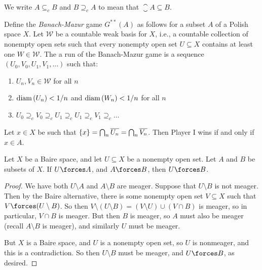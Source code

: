 \documentclass[10pt]{article}
\begin{document}
We write $A \subseteq_c B$ and $B \supseteq_c A$ to mean that $\closure{A} \subseteq B$.

Define the \emph{Banach-Mazur} game $G^{**}(A)$ as follows for a subset $A$ of a Polish space $X$.
Let $\mathcal{W}$ be a countable weak basis for $X$, i.e., a countable collection of nonempty open sets such that every nonempty open set $U \subseteq X$ contains at least one $W \in \mathcal{W}$.
The a run of the Banach-Mazur game is a sequence $(U_0, V_0, U_1, V_1, \ldots)$ such that:
\begin{enumerate}[label=(\roman*)]
    \item $U_n, V_n \in \mathcal{W}$ for all $n$
    \item $\text{diam} \left( U_n \right) < 1/n$ and $\text{diam} \left( W_n \right) < 1/n$ for all $n$
    \item $U_0 \supseteq_c V_0 \supseteq_c U_1 \supseteq_c U_1 \supseteq_c V_1 \supseteq_c \ldots$
\end{enumerate}
Let $x \in X$ be such that ${\left\{ {x} \right\}} = \bigcap_n \overline{U_n} = \bigcap_n \overline{V_n}$.
Then Player I wins if and only if $x \in A$.

\begin{proposition}\label{prop:forces-baire-meas}
    Let $X$ be a Baire space, and let $U \subseteq X$ be a nonempty open set.
    Let $A$ and $B$ be subsets of $X$.
    If $U \forces A$, and $A \forces B$, then $U \forces B$.
\end{proposition}
\begin{proof}
    We have both $U \setminus A$ and $A \setminus B$ are meager.
    Suppose that $U \setminus B$ is not meager.
    Then by the Baire alternative, there is some nonempty open set $V \subseteq X$ such that $V \forces (U \setminus B)$.
    So then $V \setminus (U \setminus B) = (V \setminus U) \cup (V \cap B)$ is meager, so in particular, $V \cap B$ is meager.
    But then $B$ is meager, so $A$ must also be meager (recall $A \setminus B$ is meager), and similarly $U$ must be meager.

    But $X$ is a Baire space, and $U$ is a nonempty open set, so $U$ is nonmeager, and this is a contradiction.
    So then $U \setminus B$ must be meager, and $U \forces B$, as desired.
\end{proof}
\end{document}
